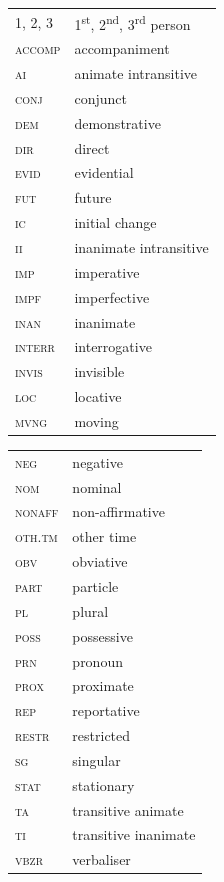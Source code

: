 \documentclass[output=paper,colorlinks,citecolor=brown]{langscibook}
\begin{document}
\begin{tabularx}{.45\textwidth}{lQ}
    1, 2, 3 & 1\textsuperscript{st}, 2\textsuperscript{nd}, 3\textsuperscript{rd} person\\
    \textsc{accomp} & accompaniment\\
    \textsc{ai} & animate intransitive\\
    \textsc{conj} & conjunct\\
    \textsc{dem} & demonstrative\\
    \textsc{dir} &  direct\\
    \textsc{evid} & evidential\\
    \textsc{fut} & future\\
    \textsc{ic} & initial change\\
    \textsc{ii} & inanimate intransitive\\
    \textsc{imp} & imperative\\
    \textsc{impf} & imperfective\\
    \textsc{inan} & inanimate\\
    \textsc{interr} & interrogative\\
    \textsc{invis} & invisible\\
    \textsc{loc} & locative\\
    \textsc{mvng} & moving\\
\end{tabularx}
\begin{tabularx}{.45\textwidth}{lQ}
    \textsc{neg} & negative \\
    \textsc{nom} & nominal\\
    \textsc{nonaff} & non-affirmative\\ 
    \textsc{oth.tm} & other time\\
    \textsc{obv} & obviative\\
    \textsc{part} & particle\\
    \textsc{pl} & plural\\
    \textsc{poss} & possessive\\
    \textsc{prn} & pronoun\\
    \textsc{prox} & proximate\\
    \textsc{rep} & reportative\\
    \textsc{restr} & restricted\\
    \textsc{sg} & singular \\
    \textsc{stat} & stationary\\ 
    \textsc{ta} & transitive animate\\
    \textsc{ti} & transitive inanimate\\
    \textsc{vbzr} & verbaliser\\
\end{tabularx}


\sloppy\printbibliography[heading=subbibliography,notkeyword=this]
\end{document}

